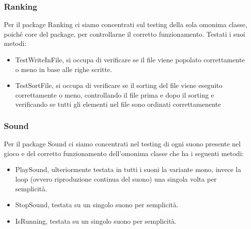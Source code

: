 \documentclass[12pt, letterpaper]{article}
\begin{document}
        \subsubsection{Ranking}
            Per il package Ranking ci siamo concentrati sul testing della sola omonima classe, poiché core del package, per controllarne il corretto funzionamento.
            Testati i suoi metodi:
                \begin{itemize}
                    \item TestWriteInFile, si occupa di verificare se il file viene popolato correttamente o meno in base alle righe scritte.
                    \item TestSortFile, si occupa di verificare se il sorting del file viene eseguito correttamente o meno, controllando il file prima e dopo il sorting e verificando se tutti gli elementi nel file sono ordinati correttamenente
                \end{itemize}
        \subsubsection{Sound}
            Per il package Sound ci siamo concentrati nel testing di ogni suono presente nel gioco e del corretto funzionamento dell'omonima classe che ha i seguenti metodi:
                \begin{itemize}
                    \item PlaySound, ulteriormente testata in tutti i suoni la variante mono, invece la loop (ovvero riproduzione continua del suono) una singola volta per semplicità.
                    \item StopSound, testata su un singolo suono per semplicità.
                    \item IsRunning, testata su un singolo suono per semplicità.
                \end{itemize}
    \newpage
\end{document}

